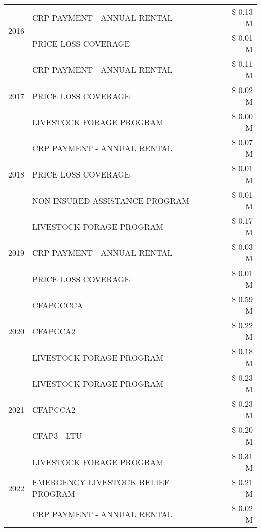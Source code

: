 \begin{tabular}{llr}
\cline{1-3}
\multirow[t]{2}{*}{2016} & CRP PAYMENT - ANNUAL RENTAL & \$ 0.13 M \\
 & PRICE LOSS COVERAGE & \$ 0.01 M \\
\cline{1-3}
\multirow[t]{3}{*}{2017} & CRP PAYMENT - ANNUAL RENTAL & \$ 0.11 M \\
 & PRICE LOSS COVERAGE & \$ 0.02 M \\
 & LIVESTOCK FORAGE PROGRAM & \$ 0.00 M \\
\cline{1-3}
\multirow[t]{3}{*}{2018} & CRP PAYMENT - ANNUAL RENTAL & \$ 0.07 M \\
 & PRICE LOSS COVERAGE & \$ 0.01 M \\
 & NON-INSURED ASSISTANCE PROGRAM & \$ 0.01 M \\
\cline{1-3}
\multirow[t]{3}{*}{2019} & LIVESTOCK FORAGE PROGRAM & \$ 0.17 M \\
 & CRP PAYMENT - ANNUAL RENTAL & \$ 0.03 M \\
 & PRICE LOSS COVERAGE & \$ 0.01 M \\
\cline{1-3}
\multirow[t]{3}{*}{2020} & CFAPCCCCA & \$ 0.59 M \\
 & CFAPCCA2 & \$ 0.22 M \\
 & LIVESTOCK FORAGE PROGRAM & \$ 0.18 M \\
\cline{1-3}
\multirow[t]{3}{*}{2021} & LIVESTOCK FORAGE PROGRAM & \$ 0.23 M \\
 & CFAPCCA2 & \$ 0.23 M \\
 & CFAP3 - LTU & \$ 0.20 M \\
\cline{1-3}
\multirow[t]{3}{*}{2022} & LIVESTOCK FORAGE PROGRAM & \$ 0.31 M \\
 & EMERGENCY LIVESTOCK RELIEF PROGRAM & \$ 0.21 M \\
 & CRP PAYMENT - ANNUAL RENTAL & \$ 0.02 M \\
\cline{1-3}
\bottomrule
\end{tabular}
